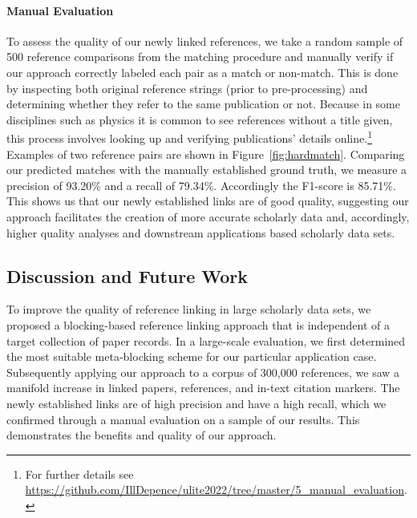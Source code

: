 \paragraph{Manual Evaluation}
To assess the quality of our newly linked references, we take a random sample of 500 reference comparisons from the matching procedure and manually verify if our approach correctly labeled each pair as a match or non-match. This is done by inspecting both original reference strings (prior to pre-processing) and determining whether they refer to the same publication or not. Because in some disciplines such as physics it is common to see references without a title given, this process involves looking up and verifying publications' details online.\footnote{For further details see \url{https://github.com/IllDepence/ulite2022/tree/master/5_manual_evaluation}.} Examples of two reference pairs are shown in Figure~\ref{fig:hardmatch}. Comparing our predicted matches with the manually established ground truth, we measure a precision of 93.20\% and a recall of 79.34\%. Accordingly the F1-score is 85.71\%.
This shows us that our newly established links are of good quality, suggesting our approach facilitates the creation of more accurate scholarly data and, accordingly, higher quality analyses and downstream applications based scholarly data sets.

\subsection{Discussion and Future Work}
To improve the quality of reference linking in large scholarly data sets, we proposed a blocking-based reference linking approach that is independent of a target collection of paper records. In a large-scale evaluation, we first determined the most suitable meta-blocking scheme for our particular application case. Subsequently applying our approach to a corpus of 300,000 references, we saw a manifold increase in linked papers, references, and in-text citation markers. The newly established links are of high precision and have a high recall, which we confirmed through a manual evaluation on a sample of our results. This demonstrates the benefits and quality of our approach.

